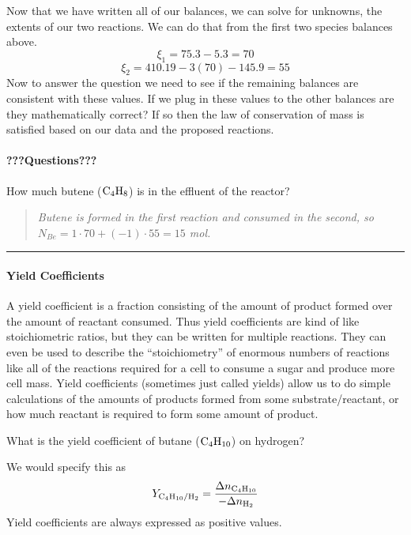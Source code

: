\documentclass[
]{article}
\begin{document}
Now that we have written all of our balances, we can solve for unknowns, the extents of our two reactions. We can do that from the first two species balances above.
\[\xi_1 = 75.3 - 5.3 = 70\]
\[\xi_2 = 410.19 - 3(70) - 145.9 = 55\]
Now to answer the question we need to see if the remaining balances are consistent with these values. If we plug in these values to the other balances are they mathematically correct? If so then the law of conservation of mass is satisfied based on our data and the proposed reactions.

\hypertarget{questions-1}{%
\paragraph{???Questions???}\label{questions-1}}

How much butene (\(\ce{C4H8}\)) is in the effluent of the reactor?

\begin{quote}
\emph{Butene is formed in the first reaction and consumed in the second, so \(N_{Be} = 1 \cdot 70 + (-1) \cdot 55 = 15\) mol.}
\end{quote}

\begin{center}\rule{0.5\linewidth}{0.5pt}\end{center}

\hypertarget{yield-coefficients}{%
\paragraph{Yield Coefficients}\label{yield-coefficients}}

A yield coefficient is a fraction consisting of the amount of product formed over the amount of reactant consumed. Thus yield coefficients are kind of like stoichiometric ratios, but they can be written for multiple reactions. They can even be used to describe the ``stoichiometry'' of enormous numbers of reactions like all of the reactions required for a cell to consume a sugar and produce more cell mass. Yield coefficients (sometimes just called yields) allow us to do simple calculations of the amounts of products formed from some substrate/reactant, or how much reactant is required to form some amount of product.

What is the yield coefficient of butane (\(\ce{C4H10}\)) on hydrogen?

We would specify this as
\[Y_{\ce{C4H10}/\ce{H2}} = \frac{\Delta n_{\ce{C4H10}}}{-\Delta n_{\ce{H2}}}\]
Yield coefficients are always expressed as positive values.
\end{document}
